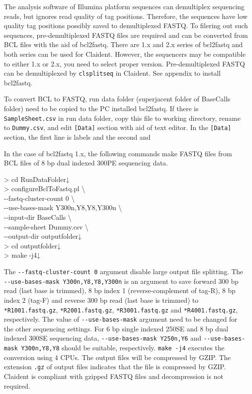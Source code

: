 \documentclass[titlepage,10pt,a4paper,english]{jsbook}
\newenvironment{cmd}{\begin{oframed}\raggedright\ttfamily\footnotesize\setlength{\baselineskip}{1.4em}}{\end{oframed}\vspace{-1em}}
\begin{document}
The analysis software of Illumina platform sequences can demultiplex sequencing reads, but ignores read quality of tag positions.
Therefore, the sequences have low quality tag positions possibly saved to demultiplexed FASTQ.
To filering out such sequences, pre-demultiplexed FASTQ files are required and can be converted from BCL files with the aid of bcl2fastq.
There are 1.x and 2.x series of bcl2fastq and both series can be used for Claident.
However, the sequencers may be compatible to either 1.x or 2.x, you need to select proper version.
Pre-demultiplexed FASTQ can be demultiplexed by \texttt{clsplitseq} in Claident.
See appendix to install bcl2fastq.

To convert BCL to FASTQ, run data folder (superjacent folder of BaseCalls folder) need to be copied to the PC installed bcl2fastq.
If there is \texttt{SampleSheet.csv} in run data folder, copy this file to working directory, rename to \texttt{Dummy.csv}, and edit \texttt{[Data]} section with aid of text editor.
In the \texttt{[Data]} section, the first line is labels and the second and 

In the case of bcl2fastq 1.x, the following commands make FASTQ files from BCL files of 8 bp dual indexed 300PE sequencing data.

\begin{cmd}
{\textgreater} cd RunDataFolder↓\\
{\textgreater} configureBclToFastq.pl {\textbackslash}\\
{-}{-}fastq-cluster-count 0 {\textbackslash}\\
{-}{-}use-bases-mask Y300n,Y8,Y8,Y300n {\textbackslash}\\
{-}{-}input-dir BaseCalls {\textbackslash}\\
{-}{-}sample-sheet Dummy.csv {\textbackslash}\\
{-}{-}output-dir outputfolder↓\\
{\textgreater} cd outputfolder↓\\
{\textgreater} make -j4↓
\end{cmd}

The \texttt{{-}{-}fastq-cluster-count 0} argument disable large output file splitting.
The \texttt{{-}{-}use-bases-mask Y300n,Y8,Y8,Y300n} is an argument to save forward 300 bp read (last base is trimmed), 8 bp index 1 (reverse-complement of tag-R), 8 bp index 2 (tag-F) and reverse 300 bp read (last base is trimmed) to \texttt{*{\textunderscore}R1{\textunderscore}001.fastq.gz}, \texttt{*{\textunderscore}R2{\textunderscore}001.fastq.gz}, \texttt{*{\textunderscore}R3{\textunderscore}001.fastq.gz} and \texttt{*{\textunderscore}R4{\textunderscore}001.fastq.gz}, respectively.
The value of \texttt{{-}{-}use-bases-mask} argument need to be changed for the other sequencing settings.
For 6 bp single indexed 250SE and 8 bp dual indexed 300SE sequencing data, \texttt{{-}{-}use-bases-mask Y250n,Y6} and \texttt{{-}{-}use-bases-mask Y300n,Y8,Y8} should be suitable, respectively.
\texttt{make -j4} executes the conversion using 4 CPUs.
The output files will be compressed by GZIP.
The extension \texttt{.gz} of output files indicates that the file is compressed by GZIP.
Claident is compliant with gzipped FASTQ files and decompression is not required.
\end{document}
